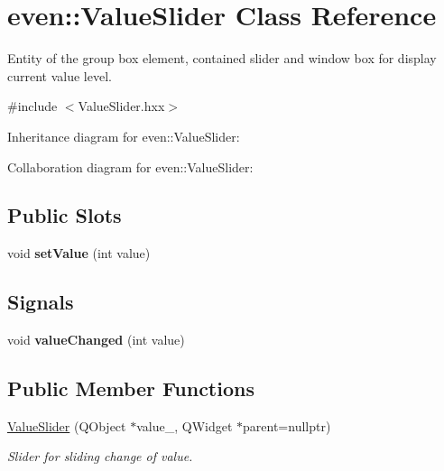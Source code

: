 \hypertarget{classeven_1_1_value_slider}{}\section{even\+:\+:Value\+Slider Class Reference}
\label{classeven_1_1_value_slider}


Entity of the group box element, contained slider and window box for display current value level.  




{\ttfamily \#include $<$Value\+Slider.\+hxx$>$}



Inheritance diagram for even\+:\+:Value\+Slider\+:


Collaboration diagram for even\+:\+:Value\+Slider\+:
\subsection*{Public Slots}
\begin{DoxyCompactItemize}
\item 
\mbox{\label{classeven_1_1_value_slider_ab884c622b3780e9bd0ed689e13dd28ca}} 
void {\bfseries set\+Value} (int value)
\end{DoxyCompactItemize}
\subsection*{Signals}
\begin{DoxyCompactItemize}
\item 
\mbox{\label{classeven_1_1_value_slider_aa41264a7855a8c238ebaaeccfcc73fda}} 
void {\bfseries value\+Changed} (int value)
\end{DoxyCompactItemize}
\subsection*{Public Member Functions}
\begin{DoxyCompactItemize}
\item 
\mbox{\hyperlink{classeven_1_1_value_slider_a69a3d2ff972e2fc0116709538b7e354f}{Value\+Slider}} (Q\+Object $\ast$value\+\_\+, Q\+Widget $\ast$parent=nullptr)
\begin{DoxyCompactList}\small\item\em Slider for sliding change of value. \end{DoxyCompactList}\end{DoxyCompactItemize}


